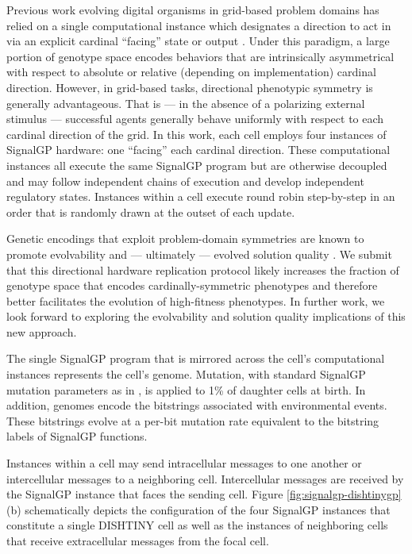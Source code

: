 Previous work evolving digital organisms in grid-based problem domains has relied on a single computational instance which designates a direction to act in via an explicit cardinal ``facing'' state or output \cite{goldsby2014evolutionary, goldsby2018serendipitous, grabowski2010early, biswas2014causes, lalejini2018evolving}.
Under this paradigm, a large portion of genotype space encodes behaviors that are intrinsically asymmetrical with respect to absolute or relative (depending on implementation) cardinal direction.
However, in grid-based tasks, directional phenotypic symmetry is generally advantageous.
That is --- in the absence of a polarizing external stimulus --- successful agents generally behave uniformly with respect to each cardinal direction of the grid.
In this work, each cell employs four instances of SignalGP hardware: one ``facing'' each cardinal direction.
These computational instances all execute the same SignalGP program but are otherwise decoupled and may follow independent chains of execution and develop independent regulatory states.
Instances within a cell execute round robin step-by-step in an order that is randomly drawn at the outset of each update.

Genetic encodings that exploit problem-domain symmetries are known to promote evolvability and --- ultimately --- evolved solution quality \cite{clune2011performance, cheney2014unshackling}.
We submit that this directional hardware replication protocol likely increases the fraction of genotype space that encodes cardinally-symmetric phenotypes and therefore better facilitates the evolution of high-fitness phenotypes.
In further work, we look forward to exploring the evolvability and solution quality implications of this new approach.

The single SignalGP program that is mirrored across the cell's computational instances represents the cell's genome.
Mutation, with standard SignalGP mutation parameters as in \cite{lalejini2018evolving}, is applied to 1\% of daughter cells at birth.
In addition, genomes encode the bitstrings associated with environmental events.
These bitstrings evolve at a per-bit mutation rate equivalent to the bitstring labels of SignalGP functions.

Instances within a cell may send intracellular messages to one another or intercellular messages to a neighboring cell.
Intercellular messages are received by the SignalGP instance that faces the sending cell.
Figure \ref{fig:signalgp-dishtinygp}(b) schematically depicts the configuration of the four SignalGP instances that constitute a single DISHTINY cell as well as the instances of neighboring cells that receive extracellular messages from the focal cell.

